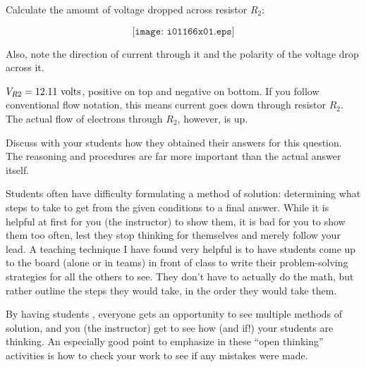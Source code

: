 

Calculate the amount of voltage dropped across resistor $R_2$:

$$\texttt{[image: i01166x01.eps]}$$

Also, note the direction of current through it and the polarity of the voltage drop across it.







$V_{R2} = 12.11 \hbox{ volts}$, positive on top and negative on bottom.  If you follow conventional flow notation, this means current goes down through resistor $R_2$.  The actual flow of electrons through $R_2$, however, is up.







Discuss with your students how they obtained their answers for this question.  The reasoning and procedures are far more important than the actual answer itself.

\vskip 10pt

Students often have difficulty formulating a method of solution: determining what steps to take to get from the given conditions to a final answer.  While it is helpful at first for you (the instructor) to show them, it is bad for you to show them too often, lest they stop thinking for themselves and merely follow your lead.  A teaching technique I have found very helpful is to have students come up to the board (alone or in teams) in front of class to write their problem-solving strategies for all the others to see.  They don't have to actually do the math, but rather outline the steps they would take, in the order they would take them.

By having students , everyone gets an opportunity to see multiple methods of solution, and you (the instructor) get to see how (and if!) your students are thinking.  An especially good point to emphasize in these ``open thinking'' activities is how to check your work to see if any mistakes were made.





